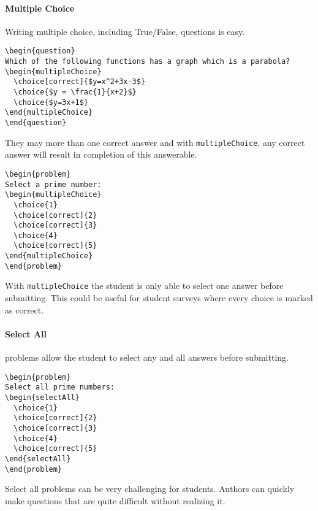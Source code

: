 \documentclass{ximera}
\begin{document}
\paragraph{Multiple Choice}
Writing multiple choice, including True/False, questions is easy.
\begin{verbatim}
\begin{question}
Which of the following functions has a graph which is a parabola?
\begin{multipleChoice}
  \choice[correct]{$y=x^2+3x-3$}
  \choice{$y = \frac{1}{x+2}$}
  \choice{$y=3x+1$}
\end{multipleChoice}
\end{question}
\end{verbatim}
They may more than one correct answer and with \verb!multipleChoice!, any
correct answer will result in completion of this answerable.
\begin{verbatim}
\begin{problem}
Select a prime number:
\begin{multipleChoice}
  \choice{1}
  \choice[correct]{2}
  \choice[correct]{3}
  \choice{4}
  \choice[correct]{5}
\end{multipleChoice}
\end{problem}
\end{verbatim}
With \verb!multipleChoice! the student is only able to select one answer before
submitting. This could be useful for student surveys where every choice is
marked as correct.

\paragraph{Select All} problems allow the student to select any and all answers
before
submitting.
\begin{verbatim}
\begin{problem}
Select all prime numbers:
\begin{selectAll}
  \choice{1}
  \choice[correct]{2}
  \choice[correct]{3}
  \choice{4}
  \choice[correct]{5}
\end{selectAll}
\end{problem}
\end{verbatim}

Select all problems can be very challenging for students. Authors can quickly
make
questions that are quite difficult without realizing it.
\end{document}
